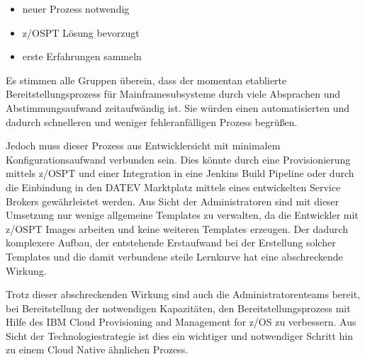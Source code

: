 \begin{itemize}
\item neuer Prozess notwendig
\item z/OSPT Lösung bevorzugt
\item erste Erfahrungen sammeln
\end{itemize}

Es stimmen alle Gruppen überein, dass der momentan etablierte Bereitstellungsprozess für Mainframesubsysteme durch viele Absprachen und Abstimmungsaufwand zeitaufwändig ist.
Sie würden einen automatisierten und dadurch schnelleren und weniger fehleranfälligen Prozess begrüßen.

Jedoch muss dieser Prozess aus Entwicklersicht mit minimalem Konfigurationsaufwand verbunden sein.
Dies könnte durch eine Provisionierung mittels z/OSPT und einer  Integration in eine Jenkins Build Pipeline oder durch die Einbindung in den \glqq DATEV Marktplatz\grqq{} mittels eines entwickelten \glqq Service Brokers\grqq{} gewährleistet werden.
Aus Sicht der Administratoren sind mit dieser Umsetzung nur wenige allgemeine Templates zu verwalten, da die Entwickler mit z/OSPT Images arbeiten und keine weiteren Templates erzeugen.
Der dadurch komplexere Aufbau, der entstehende Erstaufwand bei der Erstellung solcher Templates  und die damit verbundene steile Lernkurve hat eine abschreckende Wirkung.

Trotz dieser abschreckenden Wirkung sind auch die Administratorenteams bereit, bei Bereitstellung der notwendigen Kapazitäten, den Bereitstellungsprozess mit Hilfe des \glqq IBM Cloud Provisioning and Management for z/OS\grqq{} zu verbessern.
Aus Sicht der Technologiestrategie ist dies ein wichtiger und notwendiger Schritt hin zu einem Cloud Native ähnlichen Prozess.
